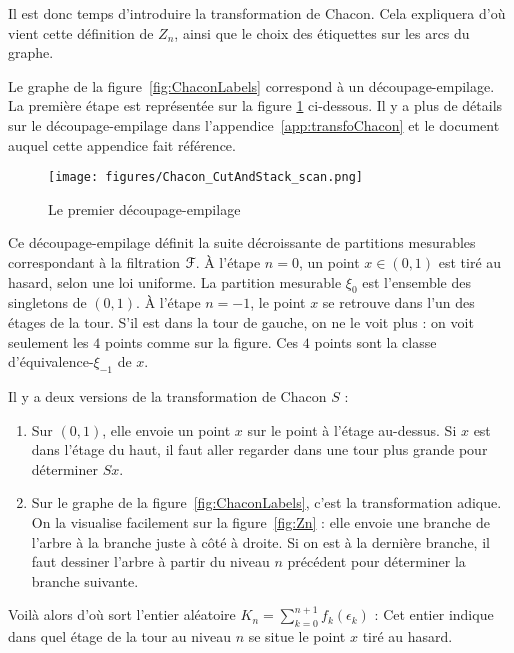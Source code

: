 \documentclass[12pt,a4paper]{article}
\begin{document}
{\scriptsize %
Il est donc temps d'introduire la transformation de Chacon. 
Cela expliquera d'où vient cette définition de $Z_n$, ainsi que le choix 
des étiquettes sur les arcs du graphe. 

Le graphe de la figure~\ref{fig:ChaconLabels} correspond à un découpage-empilage. 
La première étape est représentée sur la figure \ref{fig:scan} ci-dessous.
Il y a plus de détails sur le découpage-empilage dans l'appendice~\ref{app:transfoChacon} et 
le document auquel cette appendice fait référence.

\begin{figure}[!h]
\centering
	\texttt{[image: figures/Chacon\_CutAndStack\_scan.png]}
\caption{Le premier découpage-empilage}\label{fig:scan}
\end{figure}

Ce découpage-empilage définit la suite décroissante de partitions mesurables 
correspondant à la filtration $\EuScript{F}$. 
À l'étape $n=0$, un point $x \in (0,1)$ est tiré au hasard, selon une loi uniforme. 
La partition mesurable $\xi_0$ est l'ensemble des singletons de $(0,1)$. 
À l'étape $n=-1$, le point $x$ se retrouve dans l'un des étages de la tour. 
S'il est dans la tour de gauche, on ne le voit plus : on voit 
seulement les $4$ points comme sur la figure. Ces $4$ points sont la classe 
d'équivalence-$\xi_{-1}$ de $x$.  

Il y a deux versions de la transformation de Chacon $S$ :
\begin{enumerate}
\item Sur $(0,1)$, elle envoie un point $x$ sur le point à l'étage au-dessus. 
Si $x$ est dans l'étage du haut, il faut aller regarder dans une tour plus grande 
pour déterminer $Sx$. 

\item Sur le graphe de la  figure~\ref{fig:ChaconLabels}, c'est la transformation adique. 
On la visualise facilement sur la figure~\ref{fig:Zn} : elle envoie une branche 
de l'arbre à la branche juste à côté à droite. Si on est à la dernière branche, 
il faut dessiner l'arbre à partir du niveau $n$ précédent pour déterminer la 
branche suivante. 
\end{enumerate}

Voilà alors d'où sort l'entier aléatoire 
$K_n=\sum_{k=0}^{n+1}f_k(\epsilon_k)$ : 
Cet entier indique dans quel étage de la tour au niveau $n$ se situe 
le point $x$ tiré au hasard. 
}



\end{document}
